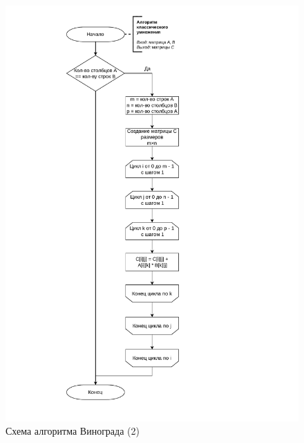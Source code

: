 \begin{figure}[h]
	\centering
	\includegraphics[height=0.9\textheight, page=3]{algo-scheme.pdf}
	\caption{Схема алгоритма Винограда (2)}
	\label{fig:vinograd2}
\end{figure}
\clearpage

